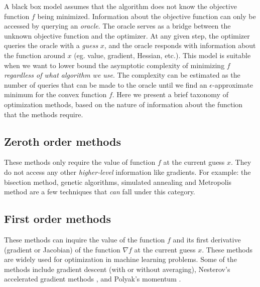 \documentclass{article}
\begin{document}
A black box model assumes that the algorithm does not know the objective function $f$ being minimized.
Information about the objective function can only be accessed by querying an \emph{oracle}. The oracle serves as a bridge between the unknown objective function and the optimizer. At any given step, the optimizer queries the oracle with a \emph{guess} $x$, and the oracle responds with information about the function around $x$ (eg. value, gradient, Hessian, etc.). This model is suitable when we want to lower bound the asymptotic complexity of minimizing $f$ {\em regardless of what algorithm we use}. The complexity can be estimated as the number of queries that can be made to the oracle until we find an $\epsilon$-approximate minimum for the convex function $f$. Here we present a brief taxonomy of optimization methods, based on the nature of information about the function that the methods require.
 
\subsection{Zeroth order methods} 

These methods only require the value of function $f$ at the current guess $x$. They do not access any other \emph{higher-level} information like gradients. For example: the bisection method, genetic algorithms, simulated annealing and Metropolis method are a few techniques that {\em can} fall under this category.

\subsection{First order methods} These methods can inquire the value of the function $f$ and its first derivative (gradient or Jacobian) of the function $\nabla f$ at the current guess $x$. These methods are widely used for optimization in machine learning problems. Some of the methods include gradient descent (with or without averaging), Nesterov's accelerated gradient methods \cite{nesterov}, and Polyak's momentum \cite{polyak}.
\end{document}
